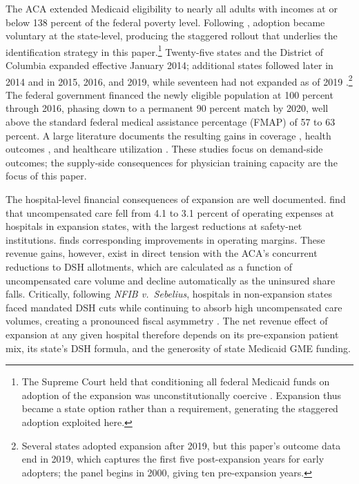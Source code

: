 The ACA extended Medicaid eligibility to nearly all adults with incomes at or below 138 percent of the federal poverty level. Following , adoption became voluntary at the state-level, producing the staggered rollout that underlies the identification strategy in this paper.\footnote{The Supreme Court held that conditioning all federal Medicaid funds on adoption of the expansion was unconstitutionally coercive \autocite{nfib_v_sebelius_2012}. Expansion thus became a state option rather than a requirement, generating the staggered adoption exploited here.} Twenty-five states and the District of Columbia expanded effective January 2014; additional states followed later in 2014 and in 2015, 2016, and 2019, while seventeen had not expanded as of 2019 \autocite{kff2024}.\footnote{Several states adopted expansion after 2019, but this paper's outcome data end in 2019, which captures the first five post-expansion years for early adopters; the panel begins in 2000, giving ten pre-expansion years.} The federal government financed the newly eligible population at 100 percent through 2016, phasing down to a permanent 90 percent match by 2020, well above the standard federal medical assistance percentage (FMAP) of 57 to 63 percent. A large literature documents the resulting gains in coverage \autocite{courtemanche2016, glied2017, kaestner2017}, health outcomes \autocite{courtemanche2018, sommers2015, sommers2017, miller2021}, and healthcare utilization \autocite{courtemanche2017, kobayashi2019, nikpay2017}. These studies focus on demand-side outcomes; the supply-side consequences for physician training capacity are the focus of this paper.

The hospital-level financial consequences of expansion are well documented. \textcite{dranove2016} find that uncompensated care fell from 4.1 to 3.1 percent of operating expenses at hospitals in expansion states, with the largest reductions at safety-net institutions. \textcite{blavin2016} finds corresponding improvements in operating margins. These revenue gains, however, exist in direct tension with the ACA's concurrent reductions to DSH allotments, which are calculated as a function of uncompensated care volume and decline automatically as the uninsured share falls. Critically, following \textit{NFIB v.\ Sebelius}, hospitals in non-expansion states faced mandated DSH cuts while continuing to absorb high uncompensated care volumes, creating a pronounced fiscal asymmetry \autocite{linehan2013,ossei-owusu2017}. The net revenue effect of expansion at any given hospital therefore depends on its pre-expansion patient mix, its state's DSH formula, and the generosity of state Medicaid GME funding.

